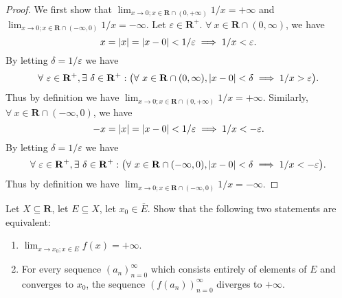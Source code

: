 \begin{proof}
    We first show that \(\lim_{x \to 0 ; x \in \mathbf{R} \cap (0, +\infty)} 1 / x = +\infty\) and \(\lim_{x \to 0 ; x \in \mathbf{R} \cap (-\infty, 0)} 1 / x = -\infty\).
    Let \(\varepsilon \in \mathbf{R}^+\).
    \(\forall\ x \in \mathbf{R} \cap (0, \infty)\), we have
    \[
        x = \abs*{x} = \abs*{x - 0} < 1 / \varepsilon \implies 1 / x < \varepsilon.
    \]
    By letting \(\delta = 1 / \varepsilon\) we have
    \[
        \forall\ \varepsilon \in \mathbf{R}^+, \exists\ \delta \in \mathbf{R}^+ : \big(\forall\ x \in \mathbf{R} \cap (0, \infty), \abs*{x - 0} < \delta \implies 1 / x > \varepsilon\big).
    \]
    Thus by definition we have \(\lim_{x \to 0 ; x \in \mathbf{R} \cap (0, +\infty)} 1 / x = +\infty\).
    Similarly, \(\forall\ x \in \mathbf{R} \cap (-\infty, 0)\), we have
    \[
        -x = \abs*{x} = \abs*{x - 0} < 1 / \varepsilon \implies 1 / x < -\varepsilon.
    \]
    By letting \(\delta = 1 / \varepsilon\) we have
    \[
        \forall\ \varepsilon \in \mathbf{R}^+, \exists\ \delta \in \mathbf{R}^+ : \big(\forall\ x \in \mathbf{R} \cap (-\infty, 0), \abs*{x - 0} < \delta \implies 1 / x < -\varepsilon\big).
    \]
    Thus by definition we have \(\lim_{x \to 0 ; x \in \mathbf{R} \cap (-\infty, 0)} 1 / x = -\infty\).
\end{proof}

\begin{additional corollary}\label{ac 9.5.3}
Let \(X \subseteq \mathbf{R}\), let \(E \subseteq X\), let \(x_0 \in \overline{E}\).
Show that the following two statements are equivalent:
\begin{enumerate}
    \item \(\lim_{x \to x_0 ; x \in E} f(x) = +\infty\).
    \item For every sequence \((a_n)_{n = 0}^\infty\) which consists entirely of elements of \(E\) and converges to \(x_0\), the sequence \((f(a_n))_{n = 0}^\infty\) diverges to \(+\infty\).
\end{enumerate}
\end{additional corollary}

